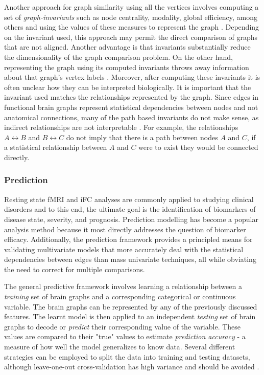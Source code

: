 Another approach for graph similarity using all the vertices involves computing a set of \emph{graph-invariants} such as node centrality, modality, global efficiency, among others and using the values of these measures to represent the graph \cite{Rubinov2010,Bullmore2011}. Depending on the invariant used, this approach may permit the direct comparison of graphs that are not aligned. Another advantage is that invariants substantially reduce the dimensionality of the graph comparison problem. On the other hand, representing the graph using its computed invariants throws away information about that graph's vertex labels \cite{Vogelstein2013}. Moreover, after computing these invariants it is often unclear how they can be interpreted biologically. It is important that the invariant used matches the relationships represented by the graph. Since edges in functional brain graphs represent statistical dependencies between nodes and not anatomical connections, many of the path based invariants do not make sense, as indirect relationships are not interpretable \cite{Rubinov2010}. For example, the relationships $A \leftrightarrow B$ and $B \leftrightarrow C$ do not imply that there is a path between nodes $A$ and $C$, if a statistical relationship between $A$ and $C$ were to exist they would be connected directly.   

\subsubsection{Prediction}

Resting state fMRI and iFC analyses are commonly applied to studying clinical disorders and to this end, the ultimate goal is the identification of biomarkers of disease state, severity, and prognosis\cite{Castellanos2013}. Prediction modelling has become a popular analysis method because it most directly addresses the question of biomarker efficacy\cite{Craddock2009, Dosenbach2010, Richiardi2013}. Additionally, the prediction framework provides a principled means for validating multivariate models that more accurately deal with the statistical dependencies between edges than mass univariate techniques, all while obviating the need to correct for multiple comparisons. 

The general predictive framework involves learning a relationship between a \emph{training} set of brain graphs and a corresponding categorical or continuous variable. The brain graphs can be represented by any of the previously discussed features. The learnt model is then applied to an independent \emph{testing} set of brain graphs to decode or \emph{predict} their corresponding value of the variable. These values are compared to their "true" values to estimate \emph{prediction accuracy} - a measure of how well the model generalizes to know data. Several different strategies can be employed to split the data into training and testing datasets, although leave-one-out cross-validation has high variance and should be avoided \cite{james2014introduction}. 

